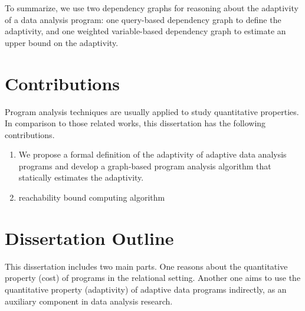 {To summarize, we use two dependency graphs for reasoning about the adaptivity of a data analysis program: 
one query-based dependency graph to define the adaptivity, and one weighted variable-based dependency graph to estimate an upper bound on the adaptivity. }

\section{Contributions}

Program analysis techniques are usually applied to study quantitative properties. In comparison to those related works, this dissertation has the following contributions.

\begin{enumerate}

\item We propose a formal definition of the adaptivity of adaptive data analysis programs and develop a graph-based program analysis algorithm that statically estimates the adaptivity.
\item reachability bound computing algorithm
\end{enumerate}

\section{Dissertation Outline}
This dissertation includes two main parts. 
One reasons about the quantitative property (cost) of programs in the relational setting. Another one aims to use the quantitative property (adaptivity) of adaptive data programs indirectly, as an auxiliary component in data analysis research.

